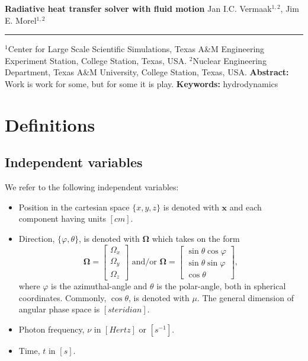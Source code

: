 \documentclass[10pt,letterpaper,notitlepage]{article}
\numberwithin{equation}{section}
\newcommand{\DOCTITLE}{Radiative heat transfer solver with fluid motion}
\newcommand{\Omegabf}{\mathbf{\Omega}}
\newcommand{\position}{\mathbf{x}}
\begin{document}
\noindent
{\LARGE\textbf{\DOCTITLE}}
\newline
\newline
\newline
\noindent
{\Large Jan I.C. Vermaak$^{1,2}$, Jim E. Morel$^{1,2}$}
\newline
\noindent\rule{\textwidth}{1pt}
{\small $^1$Center for Large Scale Scientific Simulations, Texas A\&M Engineering Experiment Station, College Station, Texas, USA.}
\newline\noindent
{\small $^2$Nuclear Engineering Department, Texas A\&M University, College Station, Texas, USA.}
\newline
\newline
\textbf{Abstract:}\newline\noindent
Work is work for some, but for some it is play.
\newline
\newline\noindent
{\small
\textbf{Keywords:} hydrodynamics}

\tableofcontents

\section{Definitions}
\subsection{Independent variables}
We refer to the following independent variables:
\begin{itemize}
	\item Position in the cartesian space $\{x,y,z\}$ is denoted with $\position$ and each component having units $[cm]$.
	\item Direction, $\{\varphi, \theta\}$, is denoted with $\Omegabf$ which takes on the form 
	$$
	\Omegabf = 
	\begin{bmatrix}
		\Omega_x \\ \Omega_y \\ \Omega_z
	\end{bmatrix}
	\text{ and/or }
	\Omegabf = 
	\begin{bmatrix}
		\sin\theta \cos\varphi \\ \sin\theta \sin\varphi \\ \cos\theta
	\end{bmatrix},
	$$
	where $\varphi$ is the azimuthal-angle and $\theta$ is the polar-angle, both in spherical coordinates. Commonly, $\cos\theta$, is denoted with $\mu$. The general dimension of angular phase space is $[steridian]$.
	\item Photon frequency, $\nu$ in $[Hertz]$ or $[s^{-1}]$.
	\item Time, $t$ in $[s]$.
\end{itemize} 
\end{document}

